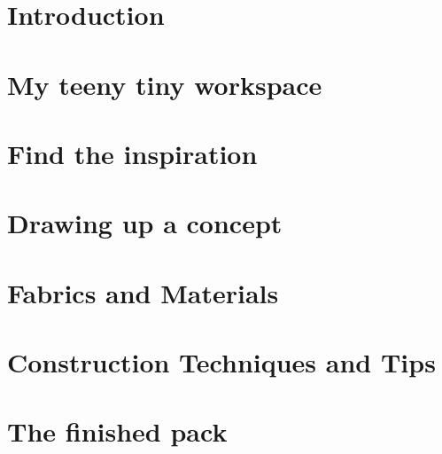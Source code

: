 \chapter{Introduction} \label{chap:intro}


\chapter{My teeny tiny workspace} \label{chap:workspace}


\chapter{Find the inspiration} \label{chap:inspiration}


\chapter{Drawing up a concept} \label{chap:drawing}


\chapter{Fabrics and Materials} \label{chap:materials}


\chapter{Construction Techniques and Tips} \label{chap:techniques}


\chapter{The finished pack} \label{chap:pack}

